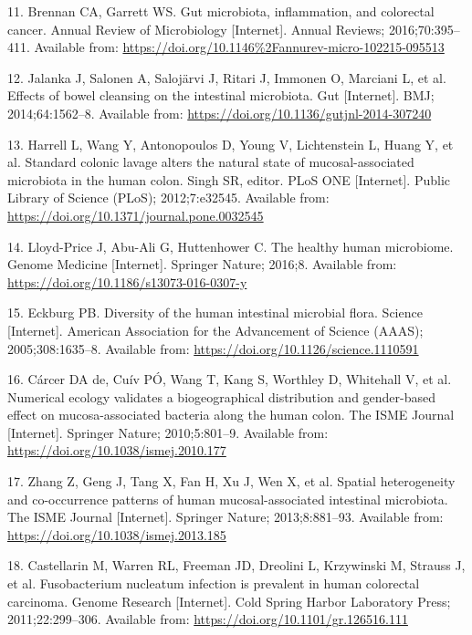 \documentclass[12pt,]{article}
\begin{document}
\hypertarget{ref-Brennan_2016}{}
11. Brennan CA, Garrett WS. Gut microbiota, inflammation, and colorectal
cancer. Annual Review of Microbiology {[}Internet{]}. Annual Reviews;
2016;70:395--411. Available from:
\url{https://doi.org/10.1146\%2Fannurev-micro-102215-095513}

\hypertarget{ref-Jalanka2014}{}
12. Jalanka J, Salonen A, Salojärvi J, Ritari J, Immonen O, Marciani L,
et al. Effects of bowel cleansing on the intestinal microbiota. Gut
{[}Internet{]}. BMJ; 2014;64:1562--8. Available from:
\url{https://doi.org/10.1136/gutjnl-2014-307240}

\hypertarget{ref-Harrell2012}{}
13. Harrell L, Wang Y, Antonopoulos D, Young V, Lichtenstein L, Huang Y,
et al. Standard colonic lavage alters the natural state of
mucosal-associated microbiota in the human colon. Singh SR, editor. PLoS
ONE {[}Internet{]}. Public Library of Science (PLoS); 2012;7:e32545.
Available from: \url{https://doi.org/10.1371/journal.pone.0032545}

\hypertarget{ref-LloydPrice2016}{}
14. Lloyd-Price J, Abu-Ali G, Huttenhower C. The healthy human
microbiome. Genome Medicine {[}Internet{]}. Springer Nature; 2016;8.
Available from: \url{https://doi.org/10.1186/s13073-016-0307-y}

\hypertarget{ref-Eckburg2005}{}
15. Eckburg PB. Diversity of the human intestinal microbial flora.
Science {[}Internet{]}. American Association for the Advancement of
Science (AAAS); 2005;308:1635--8. Available from:
\url{https://doi.org/10.1126/science.1110591}

\hypertarget{ref-deCarcer2010}{}
16. Cárcer DA de, Cuív PÓ, Wang T, Kang S, Worthley D, Whitehall V, et
al. Numerical ecology validates a biogeographical distribution and
gender-based effect on mucosa-associated bacteria along the human colon.
The ISME Journal {[}Internet{]}. Springer Nature; 2010;5:801--9.
Available from: \url{https://doi.org/10.1038/ismej.2010.177}

\hypertarget{ref-Zhang2013}{}
17. Zhang Z, Geng J, Tang X, Fan H, Xu J, Wen X, et al. Spatial
heterogeneity and co-occurrence patterns of human mucosal-associated
intestinal microbiota. The ISME Journal {[}Internet{]}. Springer Nature;
2013;8:881--93. Available from:
\url{https://doi.org/10.1038/ismej.2013.185}

\hypertarget{ref-Castellarin2011}{}
18. Castellarin M, Warren RL, Freeman JD, Dreolini L, Krzywinski M,
Strauss J, et al. Fusobacterium nucleatum infection is prevalent in
human colorectal carcinoma. Genome Research {[}Internet{]}. Cold Spring
Harbor Laboratory Press; 2011;22:299--306. Available from:
\url{https://doi.org/10.1101/gr.126516.111}
\end{document}
